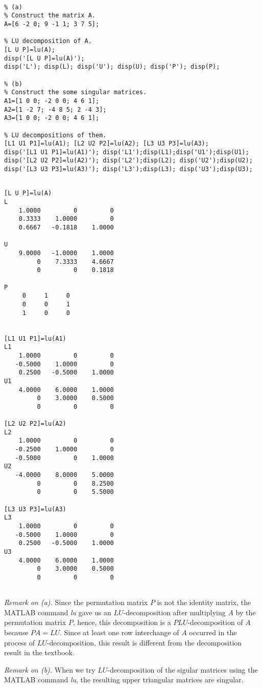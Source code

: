 \begin{sol}

\begin{verbatim}

% (a)
% Construct the matrix A.
A=[6 -2 0; 9 -1 1; 3 7 5]; 

% LU decomposition of A.
[L U P]=lu(A); 
disp('[L U P]=lu(A)');
disp('L'); disp(L); disp('U'); disp(U); disp('P'); disp(P);

% (b)
% Construct the some singular matrices.
A1=[1 0 0; -2 0 0; 4 6 1]; 
A2=[1 -2 7; -4 8 5; 2 -4 3];
A3=[1 0 0; -2 0 0; 4 6 1]; 

% LU decompositions of them.
[L1 U1 P1]=lu(A1); [L2 U2 P2]=lu(A2); [L3 U3 P3]=lu(A3); 
disp('[L1 U1 P1]=lu(A1)'); disp('L1');disp(L1);disp('U1');disp(U1);
disp('[L2 U2 P2]=lu(A2)'); disp('L2');disp(L2); disp('U2');disp(U2);
disp('[L3 U3 P3]=lu(A3)'); disp('L3');disp(L3); disp('U3');disp(U3);
\end{verbatim}

\begin{outputs}

\begin{verbatim}

[L U P]=lu(A)
L
    1.0000         0         0
    0.3333    1.0000         0
    0.6667   -0.1818    1.0000

U
    9.0000   -1.0000    1.0000
         0    7.3333    4.6667
         0         0    0.1818

P
     0     1     0
     0     0     1
     1     0     0


[L1 U1 P1]=lu(A1)
L1
    1.0000         0         0
   -0.5000    1.0000         0
    0.2500   -0.5000    1.0000
U1
    4.0000    6.0000    1.0000
         0    3.0000    0.5000
         0         0         0
         
[L2 U2 P2]=lu(A2)
L2
    1.0000         0         0
   -0.2500    1.0000         0
   -0.5000         0    1.0000
U2
   -4.0000    8.0000    5.0000
         0         0    8.2500
         0         0    5.5000
         
[L3 U3 P3]=lu(A3)
L3
    1.0000         0         0
   -0.5000    1.0000         0
    0.2500   -0.5000    1.0000
U3
    4.0000    6.0000    1.0000
         0    3.0000    0.5000
         0         0         0
         
\end{verbatim}
\end{outputs}

\noindent \textit{Remark on (a).} Since the permutation matrix $P$ is not the identity matrix, the MATLAB command \textit{lu} gave us an $LU$-decomposition after multiplying $A$ by the permutation matrix $P$, hence, this decomposition is a $PLU$-decomposition of $A$ because $PA=LU$. Since at least one row interchange of $A$ occurred in the process of $LU$-decomposition, this result is different from the decomposition result in the textbook.

\vspace{2mm}
\noindent \textit{Remark on (b).} When we try $LU$-decomposition of the sigular matrices using the MATLAB command \textit{lu}, the resulting upper triangular matrices are singular.

\end{sol}